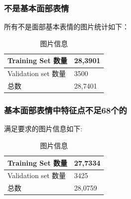 \documentclass[11pt, a4paper]{article}
\begin{document}
\subsubsection{不是基本面部表情}

所有不是面部基本表情的图片统计如下：

\begin{table}[htbp] 
	\begin{center}
		\caption{图片信息}
		\begin{tabular}{|l|p{200pt}|} \hline
			Training Set 数量 & 28,3901 \\ \hline
			Validation set 数量 & 3500 \\ \hline
			总数  & 28,7401  \\ \hline
		\end{tabular}
		
		\label{tab:kf_2}
	\end{center}
\end{table}


\subsubsection{基本面部表情中特征点不足68个的}

满足要求的图片信息如下:

\begin{table}[htbp] 
	\begin{center}
		\caption{图片信息}
		\begin{tabular}{|l|p{200pt}|} \hline
			Training Set 数量 & 27,7334 \\ \hline
			Validation set 数量 & 3425 \\ \hline
			总数  & 28,0759  \\ \hline
		\end{tabular}
		
		\label{tab:kf_3}
	\end{center}
\end{table}



  
% 





\end{document}
